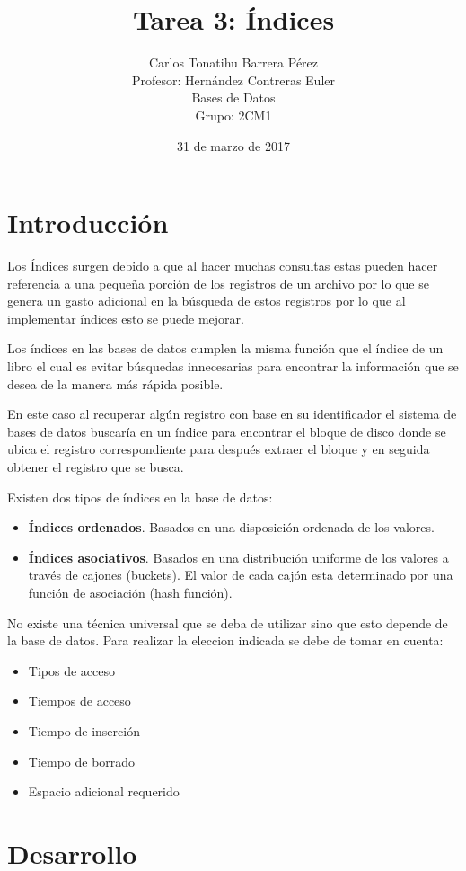 \documentclass[12pt, titlepage]{article}
\title{Tarea 3: Índices}
\author{Carlos Tonatihu Barrera Pérez \\ Profesor: Hernández Contreras Euler \\ Bases de Datos \\ Grupo: 2CM1 }
\date{31 de marzo de 2017}
\begin{document}
	\maketitle
	\tableofcontents
	\section{Introducción}
	Los Índices surgen debido a que al hacer muchas consultas estas pueden hacer referencia a una pequeña porción de los registros de un archivo por lo que se genera un gasto adicional en la búsqueda de estos registros por lo que al implementar índices esto se puede mejorar.
	
	Los índices en las bases de datos cumplen la misma función que el índice de un libro el cual es evitar búsquedas innecesarias para encontrar la información que se desea de la manera más rápida posible. 
	
	En este caso al recuperar algún registro con base en su identificador el sistema de bases de datos buscaría en un índice para encontrar el bloque de disco donde se ubica el registro correspondiente para después extraer el bloque y en seguida obtener el registro que se busca.\cite{LIBRO}
	
	Existen dos tipos de índices en la base de datos:
	\begin{itemize}
		\item \textbf{Índices ordenados}. Basados en una disposición ordenada de los valores.
		\item \textbf{Índices asociativos}. Basados en una distribución uniforme de los valores a través de cajones (buckets). El valor de cada cajón esta determinado por una función de asociación (hash función). 
	\end{itemize}
	No existe una técnica universal que se deba de utilizar sino que esto depende de la base de datos. Para realizar la eleccion indicada se debe de tomar en cuenta:
	\begin{itemize}
		\item Tipos de acceso
		\item Tiempos de acceso
		\item Tiempo de inserción
		\item Tiempo de borrado
		\item Espacio adicional requerido
	\end{itemize}
	\section{Desarrollo}
\end{document}
